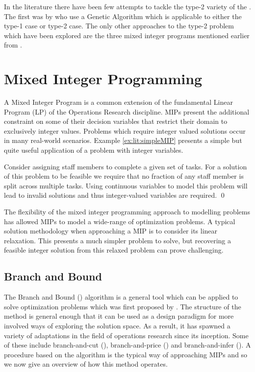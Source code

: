 In the literature there have been few attempts to tackle the type-2 variety of the \sua{}.
The first was by  who use a Genetic Algorithm
which is applicable to either the type-1 case or type-2 case.
The only other approaches to the type-2 problem
which have been explored are the three mixed integer programs
mentioned earlier from .

\section{Mixed Integer Programming}
\label{sec:lit:mip}
A Mixed Integer Program is a common extension of the fundamental
Linear Program (LP) of the Operations Research discipline.
MIPs present the additional constraint on some of their decision
variables that restrict their domain to exclusively integer values.
Problems which require integer valued solutions occur in many
real-world scenarios.
Example \ref{ex:lit:simpleMIP} presents a simple but quite
useful application of a problem with integer variables.

\begin{example}\label{ex:lit:simpleMIP}
	Consider assigning staff members to complete
	a given set of tasks.
	For a solution of this problem to be feasible we require that
	no fraction of any staff member is split across multiple tasks.
	Using continuous variables to model
	this problem will lead to invalid solutions and thus integer-valued
	variables are required. \qed
\end{example}

The flexibility of the mixed integer programming approach to modelling
problems has allowed MIPs to model a wide-range of optimization
problems.
A typical solution methodology when approaching a MIP is to
consider its linear relaxation.
This presents a much simpler problem to solve, but 
recovering a feasible integer solution from this relaxed problem
can prove challenging.

\subsection{Branch and Bound}
\label{sec:lit:mipBB}
The Branch and Bound (\bab) algorithm is a general tool which can
be applied to solve optimization problems which was first proposed by .
The structure of the method is general enough that it can be used
as a design paradigm for more involved ways of exploring the
solution space. As a result, it has spawned 
a variety of adaptations in the field of operations research since its
inception. Some of these include branch-and-cut (),
branch-and-price ()
and branch-and-infer ().
A procedure based on the \bab algorithm is the typical way of
approaching MIPs and so we now give an overview of
how this method operates.


